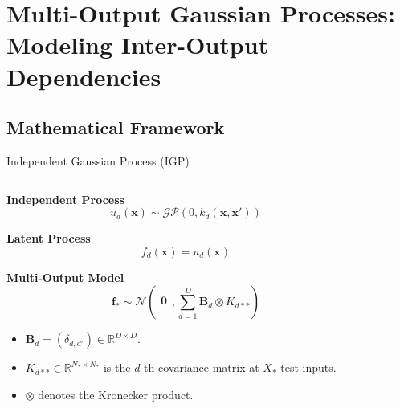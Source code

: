\section{Multi-Output Gaussian Processes: Modeling Inter-Output Dependencies}

\subsection{Mathematical Framework}

\begin{frame}{Independent Gaussian Process (IGP)}
	
	\begin{columns}[T] %
		\begin{column}{0.5\textwidth}
			
			\textbf{Independent Process} 
			\begin{equation*}
				u_{d}(\mathbf{x}) \sim \mathcal{GP}(0, k_{d}(\mathbf{x}, \mathbf{x}'))
			\end{equation*}
			
			\textbf{Latent Process}
			\begin{equation*}
				f_{d}(\mathbf{x}) = u_{d}(\mathbf{x})
			\end{equation*}
			
			
			\textbf{Multi-Output Model}
			\begin{equation*}
				\mathbf{f}_{*}
				\sim
				\mathcal{N} \left(
				\begin{array}{c}
					\mathbf{0}\\
				\end{array},
				\sum_{d=1}^D \mathbf{B}_d \otimes K_{d**}\right)
			\end{equation*}
			
			\begin{itemize}
				\item  $\mathbf{B}_d = (\delta_{d,d'}) \in \mathbb{R}^{D \times D}$.
				
				\item $K_{d**} \in \mathbb{R}^{N_* \times N_*}$ is the $d$-th covariance matrix at $X_*$ test inputs.
				
				\item $\otimes$ denotes the Kronecker product.
			\end{itemize}	
			
		\end{column}
		
		\begin{column}{0.5\textwidth}
			\setlength{} 
			\setlength{}
				
		\end{column}
		
	\end{columns}
\end{frame}


